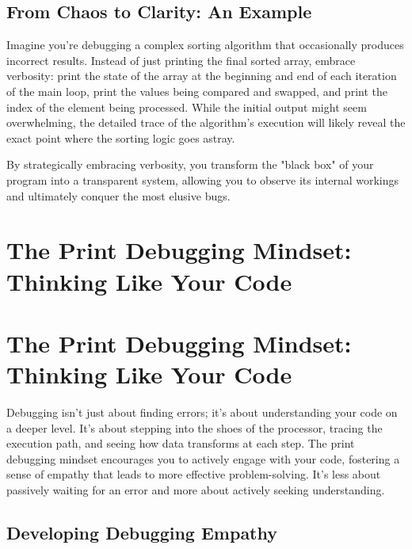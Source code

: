 \documentclass{article}
\begin{document}
\subsection*{From Chaos to Clarity: An Example}

Imagine you're debugging a complex sorting algorithm that occasionally produces incorrect results.  Instead of just printing the final sorted array, embrace verbosity: print the state of the array at the beginning and end of each iteration of the main loop, print the values being compared and swapped, and print the index of the element being processed.  While the initial output might seem overwhelming, the detailed trace of the algorithm's execution will likely reveal the exact point where the sorting logic goes astray.

By strategically embracing verbosity, you transform the "black box" of your program into a transparent system, allowing you to observe its internal workings and ultimately conquer the most elusive bugs.

\newpage

\section*{The Print Debugging Mindset: Thinking Like Your Code} %
\label{chapter-2-10-The_Print_Debugging_Mindset__Thinking_Li}

\section*{The Print Debugging Mindset: Thinking Like Your Code}

Debugging isn't just about finding errors; it's about understanding your code on a deeper level. It's about stepping into the shoes of the processor, tracing the execution path, and seeing how data transforms at each step. The print debugging mindset encourages you to actively engage with your code, fostering a sense of empathy that leads to more effective problem-solving. It's less about passively waiting for an error and more about actively seeking understanding.

\subsection*{Developing Debugging Empathy}
\end{document}
